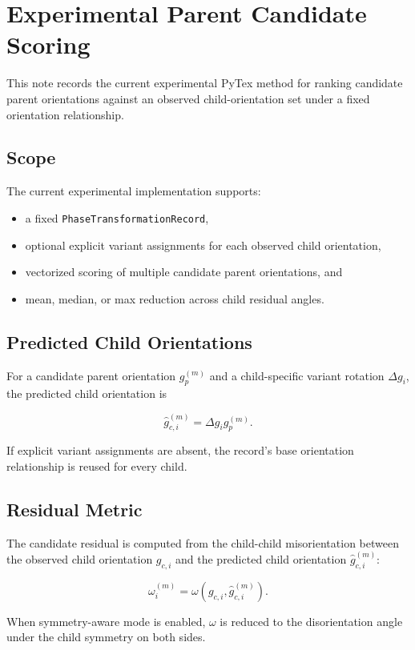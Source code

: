 \section{Experimental Parent Candidate Scoring}

This note records the current experimental PyTex method for ranking candidate parent orientations
against an observed child-orientation set under a fixed orientation relationship.

\subsection{Scope}

The current experimental implementation supports:

\begin{itemize}
  \item a fixed \texttt{PhaseTransformationRecord},
  \item optional explicit variant assignments for each observed child orientation,
  \item vectorized scoring of multiple candidate parent orientations, and
  \item mean, median, or max reduction across child residual angles.
\end{itemize}

\subsection{Predicted Child Orientations}

For a candidate parent orientation $g_p^{(m)}$ and a child-specific variant rotation
$\Delta g_i$, the predicted child orientation is

\[
\hat{g}_{c,i}^{(m)} = \Delta g_i g_p^{(m)}.
\]

If explicit variant assignments are absent, the record's base orientation relationship is reused
for every child.

\subsection{Residual Metric}

The candidate residual is computed from the child-child misorientation between the observed child
orientation $g_{c,i}$ and the predicted child orientation $\hat{g}_{c,i}^{(m)}$:

\[
\omega_i^{(m)} = \omega\!\left(g_{c,i}, \hat{g}_{c,i}^{(m)}\right).
\]

When symmetry-aware mode is enabled, $\omega$ is reduced to the disorientation angle under the
child symmetry on both sides.

